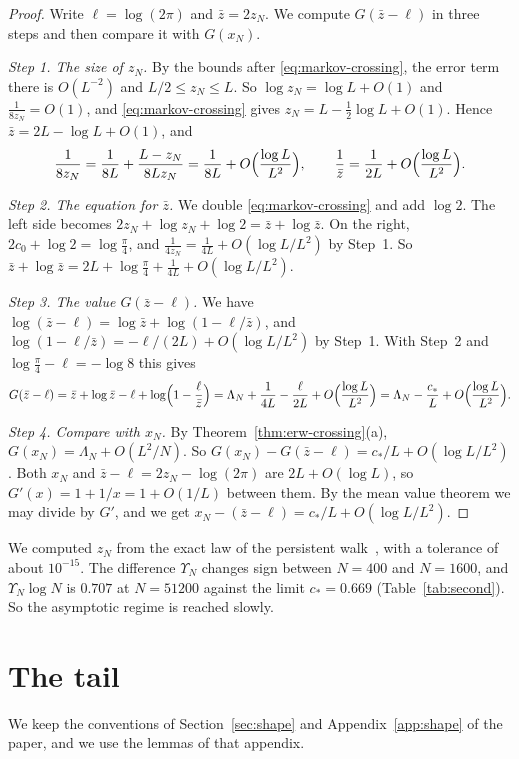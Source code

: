 \begin{proof}
Write $\ell=\log(2\pi)$ and $\bar z=2z_N$. We compute $G(\bar z-\ell)$ in three steps
and then compare it with $G(x_N)$.

\emph{Step 1. The size of $z_N$.} By the bounds after \eqref{eq:markov-crossing},
the error term there is $O(L^{-2})$ and $L/2\le z_N\le L$. So
$\log z_N=\log L+O(1)$ and $\frac1{8z_N}=O(1)$, and
\eqref{eq:markov-crossing} gives $z_N=L-\frac12\log L+O(1)$. Hence
$\bar z=2L-\log L+O(1)$, and
\[
 \frac1{8z_N}=\frac1{8L}+\frac{L-z_N}{8Lz_N}=\frac1{8L}+O\Bigl(\frac{\log L}{L^2}\Bigr),
 \qquad\frac1{\bar z}=\frac1{2L}+O\Bigl(\frac{\log L}{L^2}\Bigr).
\]

\emph{Step 2. The equation for $\bar z$.} We double \eqref{eq:markov-crossing} and
add $\log2$. The left side becomes $2z_N+\log z_N+\log2=\bar z+\log\bar z$. On the
right, $2c_0+\log2=\log\frac\pi4$, and $\frac1{4z_N}=\frac1{4L}+O(\log L/L^2)$
by Step~1. So $\bar z+\log\bar z=2L+\log\frac\pi4+\frac1{4L}+O(\log L/L^2)$.

\emph{Step 3. The value $G(\bar z-\ell)$.} We have
$\log(\bar z-\ell)=\log\bar z+\log(1-\ell/\bar z)$, and
$\log(1-\ell/\bar z)=-\ell/(2L)+O(\log L/L^2)$ by Step~1. With Step~2 and
$\log\frac\pi4-\ell=-\log8$ this gives
\[
 G(\bar z-\ell)=\bar z+\log\bar z-\ell+\log\Bigl(1-\frac\ell{\bar z}\Bigr)
 =\Lambda_N+\frac1{4L}-\frac\ell{2L}+O\Bigl(\frac{\log L}{L^2}\Bigr)
 =\Lambda_N-\frac{c_*}L+O\Bigl(\frac{\log L}{L^2}\Bigr).
\]

\emph{Step 4. Compare with $x_N$.} By Theorem~\ref{thm:erw-crossing}(a),
$G(x_N)=\Lambda_N+O(L^2/N)$. So
$G(x_N)-G(\bar z-\ell)=c_*/L+O(\log L/L^2)$. Both $x_N$ and
$\bar z-\ell=2z_N-\log(2\pi)$ are $2L+O(\log L)$, so $G'(x)=1+1/x=1+O(1/L)$
between them. By the mean value theorem we may divide by $G'$, and we get
$x_N-(\bar z-\ell)=c_*/L+O(\log L/L^2)$.
\end{proof}

We computed $z_N$ from the exact law of the persistent walk~\cite{paperA}, with a tolerance
of about $10^{-15}$. The difference $\Upsilon_N$ changes sign between $N=400$ and $N=1600$, and
$\Upsilon_N\log N$ is $0.707$ at $N=51200$ against the limit $c_*=0.669$
(Table~\ref{tab:second}). So the asymptotic regime is reached slowly.

\section{The tail}\label{or:tail}

We keep the conventions of Section~\ref{sec:shape} and
Appendix~\ref{app:shape} of the paper, and we use the lemmas of that
appendix.

